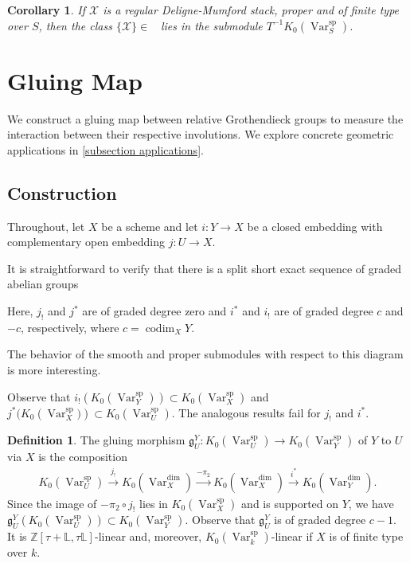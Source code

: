 \documentclass{amsart}
\newtheorem{cor}[thm]{Corollary}
\theoremstyle{definition}
\newtheorem{defn}[thm]{Definition}
\DeclareMathOperator{\Var}{Var}
\DeclareMathOperator{\codim}{codim}
\DeclareMathOperator{\spr}{sp}
\DeclareMathOperator{\Stk}{Stk}
\newcommand{\KsprS}{K_0(\Var_S^{\spr})}
\newcommand{\Kspr}{K_0(\Var_k^{\spr})}
\DeclareMathOperator{\KstkS}{K_0(\Stk_S^{\dim})}
\numberwithin{equation}{section}
\begin{document}
\begin{cor}\label{DM in spr}
If $\mathscr{X}$ is a regular Deligne-Mumford stack, proper and of finite type over $S$, then the class $\{ \mathscr{X} \} \in \KstkS$ lies in the submodule $T^{-1} \KsprS$. 
\end{cor}







\section{Gluing Map}\label{gluing map}

We construct a gluing map between relative Grothendieck groups to measure the interaction between their respective involutions. We explore concrete geometric applications in \ref{subsection applications}. 

\subsection{Construction}

Throughout, let $X$ be a scheme and let $i:Y \rightarrow X$ be a closed embedding with complementary open embedding $j: U \rightarrow X$.

It is straightforward to verify that there is a split short exact sequence of graded abelian groups
\begin{center}
\end{center}
Here, $j_!$ and $j^*$ are of graded degree zero and $i^*$ and $i_!$ are of graded degree $c$ and $-c$, respectively, where $c = \codim_X Y$.

The behavior of the smooth and proper submodules with respect to this diagram is more interesting.

Observe that $i_!(K_0(\Var_Y^{\spr})) \subset K_0(\Var_X^{\spr})$ and $j^* \big( K_0(\Var_X^{\spr} \big)) \subset K_0(\Var_U^{\spr})$. The analogous results fail for $j_!$ and $i^*$.

\begin{defn}
The gluing morphism $\mathfrak{g}_{U}^Y: K_0(\Var_U^{\spr}) \rightarrow K_0(\Var_Y^{\spr})$ of $Y$ to $U$ via $X$ is the composition
\begin{align*}
    K_0(\Var_U^{\spr}) \xrightarrow[]{j_!} K_0(\Var_X^{\dim}) \xrightarrow[]{-\pi_2} K_0(\Var_X^{\dim}) \xrightarrow[]{i^*} K_0(\Var_Y^{\dim}).
\end{align*}
Since the image of $-\pi_2 \circ j_!$ lies in $K_0(\Var_X^{\spr})$ and is supported on $Y$, we have $\mathfrak{g}_U^Y(K_0(\Var_U^{\spr})) \subset K_0(\Var_Y^{\spr})$. Observe that $\mathfrak{g}_{U}^Y$ is of graded degree $c-1$. It is $\mathbb{Z}[\tau+ \mathbb{L}, \tau \mathbb{L}]$-linear and, moreover, $\Kspr$-linear if $X$ is of finite type over $k$.
\end{defn}
\end{document}
